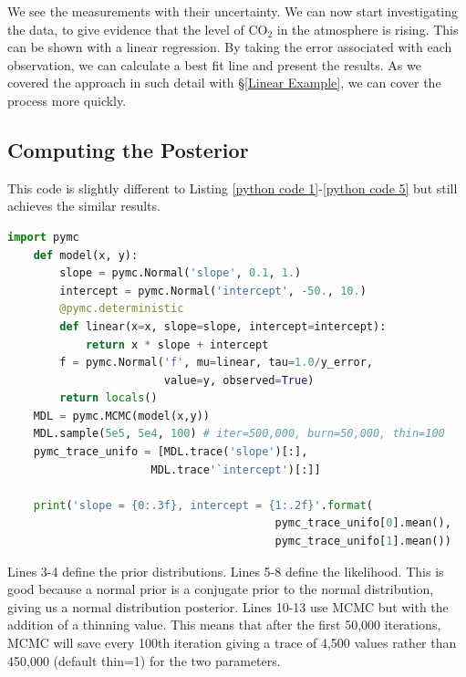 \documentclass[12pt,twoside]{report}   %
\def\StartLineAt#1{\lstset{firstnumber=#1}}
\begin{document}
We see the measurements with their uncertainty. We can now start investigating the data, to give evidence that the level of $\mathrm{CO_2}$ in the atmosphere is rising. This can be shown with a linear regression. By taking the error associated with each observation, we can calculate a best fit line and present the results. As we covered the approach in such detail with \S\ref{Linear Example}, we can cover the process more quickly.

\subsection{Computing the Posterior}\label{Computing the Posterior3}

This code is slightly different to Listing \ref{python code 1}-\ref{python code 5} but still achieves the similar results.
\StartLineAt1
\begin{lstlisting}[label={python code 7},caption={Climate change code snippet},language=Python]
	import pymc
	def model(x, y): 
    	slope = pymc.Normal('slope', 0.1, 1.)
    	intercept = pymc.Normal('intercept', -50., 10.)
    	@pymc.deterministic
    	def linear(x=x, slope=slope, intercept=intercept):
        	return x * slope + intercept
    	f = pymc.Normal('f', mu=linear, tau=1.0/y_error,
    	                value=y, observed=True)
    	return locals()
	MDL = pymc.MCMC(model(x,y))
	MDL.sample(5e5, 5e4, 100) # iter=500,000, burn=50,000, thin=100
	pymc_trace_unifo = [MDL.trace('slope')[:],
                      MDL.trace'`intercept')[:]]

	print('slope = {0:.3f}, intercept = {1:.2f}'.format(
	                                     pymc_trace_unifo[0].mean(),
	                                     pymc_trace_unifo[1].mean())
\end{lstlisting}

Lines 3-4 define the prior distributions. Lines 5-8 define the likelihood. This is good because a normal prior is a conjugate prior to the normal distribution, giving us a normal distribution posterior. Lines 10-13 use MCMC but with the addition of a thinning value. This means that after the first 50,000 iterations, MCMC will save every 100th iteration giving a trace of 4,500 values rather than 450,000 (default thin=1) for the two parameters. 
\end{document}
